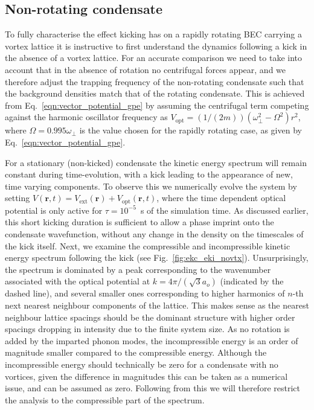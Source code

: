 \subsection{Non-rotating condensate}
To fully characterise the effect kicking has on a rapidly rotating BEC carrying a vortex lattice it is instructive to first understand the dynamics following a kick in the absence of a vortex lattice. For an accurate comparison we need to take into account that in the absence of rotation no centrifugal forces appear, and we therefore adjust the trapping frequency of the non-rotating condensate such that the background densities match that of the rotating condensate. This is achieved from Eq.~\eqref{eqn:vector_potential_gpe} by assuming the centrifugal term competing against the harmonic oscillator frequency  as $V_{\text{opt}} = (1/(2m))(\omega^2_\perp - \Omega^2)
{r}^2$, where $\Omega=0.995\omega_\perp$ is the value chosen for the rapidly rotating case, as given by Eq.~\eqref{eqn:vector_potential_gpe}.

For a stationary (non-kicked) condensate the kinetic energy spectrum will remain constant during time-evolution, with a kick leading to the appearance of new, time varying components. To observe this we numerically evolve the system by setting $V(\mathbf{r},t) = V_{\text{ext}}(\mathbf{r}) + V_{\text{opt}}(\mathbf{r},t)$, where the time dependent optical potential is only active for $\tau=10^{-5}$~s of the simulation time. As discussed earlier, this short kicking duration is sufficient to allow a phase imprint onto the condensate wavefunction, without any change in the density on the timescales of the kick itself. Next, we examine the compressible and incompressible kinetic energy spectrum following the kick (see Fig.~\ref{fig:ekc_eki_novtx}). Unsurprisingly, the spectrum is dominated by a peak corresponding to the wavenumber associated with the optical potential at $k=4\pi/(\sqrt{3}a_o)$ (indicated by the dashed line), and several smaller ones corresponding to higher harmonics of $n$-th next nearest neighbour components of the lattice. This makes sense as the nearest neighbour lattice spacings should be the dominant structure with higher order spacings dropping in intensity due to the finite system size. As no rotation is added by the imparted phonon modes, the incompressible energy is an order of magnitude smaller compared to the compressible energy. Although the incompressible energy should technically be zero for a condensate with no vortices, given the difference in magnitudes this can be taken as a numerical issue, and can be assumed as zero. Following from this we will therefore restrict the analysis to the compressible part of the spectrum.

